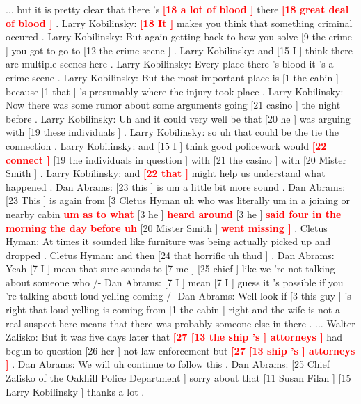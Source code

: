 \documentclass[11pt,a4paper]{article}
\begin{document}
\begin{figure*}[ht!]
... but it is pretty clear that there 's \textcolor{red}{\bf [18 a lot of blood ]} there \textcolor{red}{\bf [18 great deal of blood ]} . Larry Kobilinsky: \textcolor{red}{\bf [18 It ]} makes you think that something criminal occured . Larry Kobilinsky: But again getting back to how you solve [9 the crime ] you got to go to [12 the crime scene ] . Larry Kobilinsky: and [15 I ] think there are multiple scenes here . Larry Kobilinsky: Every place there 's blood it 's a crime scene . Larry Kobilinsky: But the most important place is [1 the cabin ] because [1 that ] 's presumably where the injury took place . Larry Kobilinsky: Now there was some rumor about some arguments going [21 casino ] the night before . Larry Kobilinsky: Uh and it could very well be that [20 he ] was arguing with [19 these individuals ] . Larry Kobilinsky: so uh that could be the tie the connection . Larry Kobilinsky: and [15 I ] think good policework would \textcolor{red}{\bf [22 connect ]} [19 the individuals in question ] with [21 the casino ] with [20 Mister Smith ] . Larry Kobilinsky: and \textcolor{red}{\bf [22 that ]} might help us understand what happened . Dan Abrams: [23 this ] is um a little bit more sound . Dan Abrams: [23 This ] is again from [3 Cletus Hyman uh who was literally um in a joining or nearby cabin \textcolor{red}{\bf um as to what} [3 he ] \textcolor{red}{\bf heard around} [3 he ] \textcolor{red}{\bf said four in the morning the day before uh } [20 Mister Smith ] \textcolor{red}{\bf went missing ]} . Cletus Hyman: At times it sounded like furniture was being actually picked up and dropped . Cletus Hyman: and then [24 that horrific uh thud ] . Dan Abrams: Yeah [7 I ] mean that sure sounds to [7 me ] [25 chief ] like we 're not talking about someone who /- Dan Abrams: [7 I ] mean [7 I ] guess it 's possible if you 're talking about loud yelling coming /- Dan Abrams: Well look if [3 this guy ] 's right that loud yelling is coming from [1 the cabin ] right and the wife is not a real suspect here means that there was probably someone else in there . ... Walter Zalisko: But it was five days later that \textcolor{red}{\bf [27 [13 the ship 's ] attorneys ]} had begun to question [26 her ] not law enforcement but \textcolor{red}{\bf [27 [13 ship 's ] attorneys ]} . Dan Abrams: We will uh continue to follow this . Dan Abrams: [25 Chief Zalisko of the Oakhill Police Department ] sorry about that [11 Susan Filan ] [15 Larry Kobilinsky ] thanks a lot .

\caption{Mistakes picked from CoNLL-2012 development, e.g., the coreferences {\em [18 a lot of blood]} as well as [27 [13 the ship ’s ] attorneys] are not in the gold annotation.  
\label{fig:english-example2}
}

\end{figure*}


\iftaclpubformat

\onecolumn

\appendix












 
\end{document}
